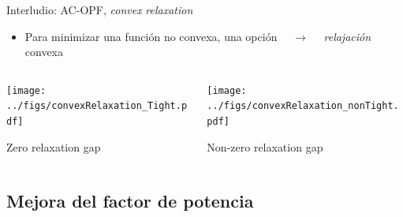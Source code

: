 \documentclass[aspectratio=169, usenames,svgnames,dvipsnames]{beamer}
\begin{document}
\begin{frame}{Interludio: \hspace{3mm}AC-OPF, \hspace{3mm}\textit{convex} \hspace{0.5mm}\textit{relaxation}}

    \vspace{-5mm}
    
    \begin{itemize}
        \item Para \alert{minimizar} una función \alert{no convexa}, una opción $\quad \rightarrow \quad$ \textit{relajación} \hspace{0.5mm}convexa
    \end{itemize}

    \begin{columns}
    \begin{column}{0.5\columnwidth}
        \begin{center}    
            \texttt{[image: ../figs/convexRelaxation\_Tight.pdf]}

            Zero relaxation gap
        \end{center}
    \end{column}
    \begin{column}{0.5\columnwidth}
        \begin{center}    
            \texttt{[image: ../figs/convexRelaxation\_nonTight.pdf]}

            Non-zero relaxation gap
        \end{center}
    \end{column}
    \end{columns}

    \vspace{-21mm}
    
    \hspace{37mm}
\end{frame}


\subsection{Mejora del factor de potencia}
\end{document}
